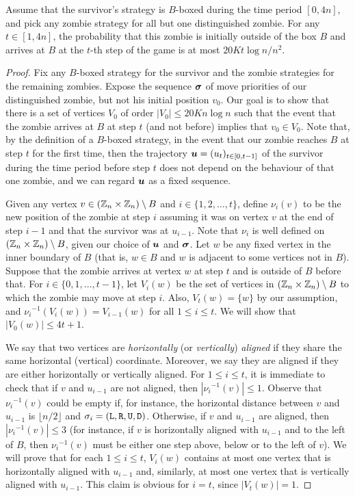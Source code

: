 \documentclass[12pt]{amsart}
\begin{document}
\begin{lemma}\label{lem:arrivalB}
Assume that the survivor's strategy is $B$-boxed during the time period $[0,4n]$, and pick any zombie strategy for all but one distinguished zombie. For any $t\in[1,4n]$, the probability that this
zombie is initially outside of the box $B$ and arrives at $B$ at the $t$-th step of the game is at most $20Kt\log n/n^2$.
\end{lemma}
\begin{proof}
Fix any $B$-boxed strategy for the survivor and the zombie strategies for the remaining zombies. Expose the sequence ${\boldsymbol\sigma}$ of move priorities of our distinguished zombie, but not his initial
position $v_0$. Our goal is to show that there is a set of vertices $V_0$ of order $|V_0|\le 20Kn\log n$ such that the event that the zombie arrives at $B$ at step $t$ (and not before) implies that
$v_0\in V_0$. Note that, by the definition of a $B$-boxed strategy, in the event that our zombie reaches $B$ at step $t$ for the first time, then the trajectory ${\boldsymbol u} = (u_t)_{t\in[0,t-1]}$ of the
survivor during the time period before step $t$ does not depend on the behaviour of that one zombie, and we can regard ${\boldsymbol u}$ as a fixed sequence.

Given any vertex $v\in ({\mathbb Z}_n\times{\mathbb Z}_n) \setminus B$ and $i\in\{1,2,\ldots, t\}$, define $\nu_i(v)$ to be the new position of the zombie at step $i$ assuming it was on vertex $v$ at the end of step
$i-1$ and that the survivor was at $u_{i-1}$. Note that $\nu_i$ is well defined on $({\mathbb Z}_n\times{\mathbb Z}_n) \setminus B$, given our choice of ${\boldsymbol u}$ and ${\boldsymbol\sigma}$. Let $w$ be any fixed vertex in the inner
boundary of $B$ (that is, $w\in B$ and $w$ is adjacent to some vertices not in $B$). Suppose that the zombie arrives at vertex $w$ at step $t$ and is outside of $B$ before that. For
$i\in\{0,1,\ldots,t-1\}$,  let $V_i(w)$ be the set of vertices in $({\mathbb Z}_n\times{\mathbb Z}_n) \setminus B$ to which the zombie may move at step $i$. Also, $V_t(w)=\{w\}$ by our assumption, and
${\nu_i}^{-1}  ( V_i(w) ) = V_{i-1}(w)$ for all $1\le i\le t$. We will show that $|V_{0}(w)| \le 4t+1$.

We say that two vertices are \emph{horizontally} (or \emph{vertically}) \emph{aligned} if they share the same  horizontal (vertical) coordinate. Moreover, we say they are aligned if they are either
horizontally or vertically aligned. For $1\le i\le t$, it is immediate to check that if $v$ and $u_{i-1}$ are not aligned, then $|{\nu_i}^{-1}(v)|\le1$. Observe that ${\nu_i}^{-1}(v)$ could be empty
if, for instance, the horizontal distance between $v$ and $u_{i-1}$ is $\lfloor n/2\rfloor$ and $\sigma_i=({\mathtt L},{\mathtt R},{\mathtt U},{\mathtt D})$. Otherwise, if $v$ and $u_{i-1}$ are aligned, then $|{\nu_i}^{-1}(v)|\le
3$ (for instance, if $v$ is horizontally aligned with $u_{i-1}$ and to the left of $B$, then ${\nu_i}^{-1}(v)$ must be either one step above, below or to the left of $v$). We will prove that for
each $1\le i\le t$, $V_i(w)$ contains at most one vertex that is horizontally aligned with $u_{i-1}$ and, similarly, at most one vertex that is vertically aligned with $u_{i-1}$. This claim is
obvious for $i=t$, since $|V_t(w)|=1$. 


\end{proof}
\end{document}
